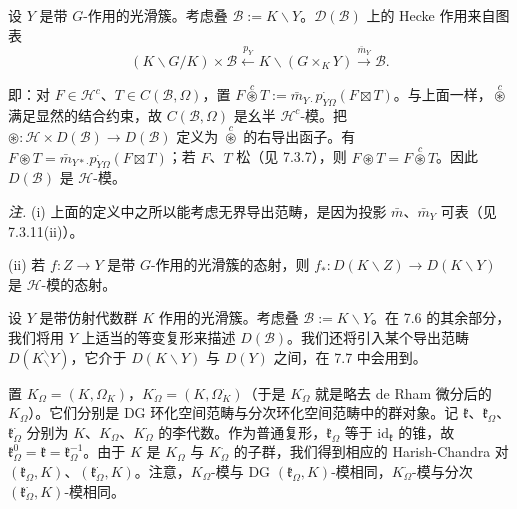 设 $Y$ 是带 $G$-作用的光滑簇。考虑叠 $\mathcal{B}:=K\backslash Y$。$\mathcal{D}(\mathcal{B})$ 上的 Hecke 作用来自图表
\begin{equation}\tag{319}
(K\backslash G/K)\times\mathcal{B}\xleftarrow{p_{Y}}K\backslash(G\times_{K}Y)\xrightarrow{\bar m_{Y}}\mathcal{B}.
\end{equation}

即：对 $F\in\mathcal{H}^{c}$、$T\in C(\mathcal{B},\Omega)$，置 $F\overset{c}{\circledast}T:=\bar m_{Y\cdot}p^{\cdot}_{Y\Omega}(F\boxtimes T)$。与上面一样，$\overset{c}{\circledast}$ 满足显然的结合约束，故 $C(\mathcal{B},\Omega)$ 是幺半 $\mathcal{H}^{c}$-模。把 $\circledast:\mathcal{H}\times D(\mathcal{B})\longrightarrow D(\mathcal{B})$ 定义为 $\overset{c}{\circledast}$ 的右导出函子。有 $F\circledast T=\bar m_{Y*\cdot}p^{\cdot}_{Y\Omega}(F\boxtimes T)$；若 $F$、$T$ 松（见 7.3.7），则 $F\circledast T=F\overset{c}{\circledast}T$。因此 $D(\mathcal{B})$ 是 $\mathcal{H}$-模。

 \emph{注.} (i) 上面的定义中之所以能考虑无界导出范畴，是因为投影 $\bar m$、$\bar m_{Y}$ 可表（见 7.3.11(ii)）。

(ii) 若 $f:Z\to Y$ 是带 $G$-作用的光滑簇的态射，则 $f_{*}:D(K\backslash Z)\to D(K\backslash Y)$ 是 $\mathcal{H}$-模的态射。

 设 $Y$ 是带仿射代数群 $K$ 作用的光滑簇。考虑叠 $\mathcal{B}:=K\backslash Y$。在 7.6 的其余部分，我们将用 $Y$ 上适当的等变复形来描述 $D(\mathcal{B})$。我们还将引入某个导出范畴 $D(K^{\backslash}_{\backslash}Y)$，它介于 $D(K\backslash Y)$ 与 $D(Y)$ 之间，在 7.7 中会用到。


置 $K_{\Omega}=(K,\Omega_{K})$，$K^{\cdot}_{\Omega}=(K,\Omega^{\cdot}_{K})$（于是 $K^{\cdot}_{\Omega}$ 就是略去 de Rham 微分后的 $K_{\Omega}$）。它们分别是 DG 环化空间范畴与分次环化空间范畴中的群对象。记 $\mathfrak{k}$、$\mathfrak{k}_{\Omega}$、$\mathfrak{k}^{\cdot}_{\Omega}$ 分别为 $K$、$K_{\Omega}$、$K^{\cdot}_{\Omega}$ 的李代数。作为普通复形，$\mathfrak{k}_{\Omega}$ 等于 $\mathrm{id}_{\mathfrak{k}}$ 的锥，故 $\mathfrak{k}^{0}_{\Omega}=\mathfrak{k}=\mathfrak{k}^{-1}_{\Omega}$。由于 $K$ 是 $K_{\Omega}$ 与 $K^{\cdot}_{\Omega}$ 的子群，我们得到相应的 Harish-Chandra 对 $(\mathfrak{k}_{\Omega},K)$、$(\mathfrak{k}^{\cdot}_{\Omega},K)$。注意，$K_{\Omega}$-模与 DG $(\mathfrak{k}_{\Omega},K)$-模相同，$K^{\cdot}_{\Omega}$-模与分次 $(\mathfrak{k}^{\cdot}_{\Omega},K)$-模相同。


